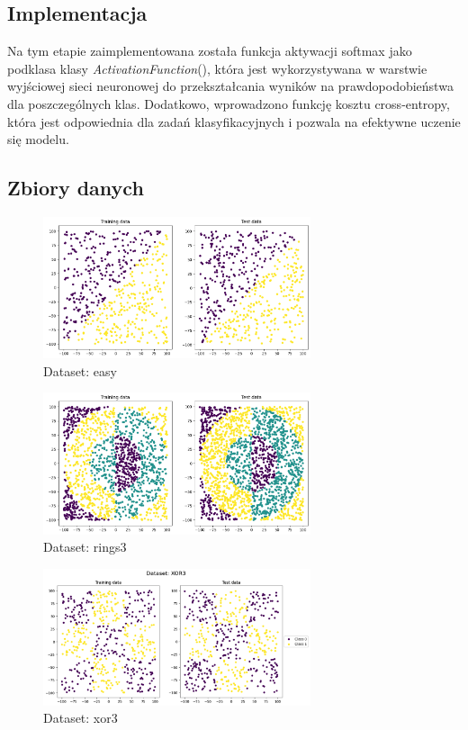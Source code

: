 \documentclass{article}
\begin{document}
\subsection*{Implementacja}
Na tym etapie zaimplementowana została funkcja aktywacji softmax jako podklasa klasy \textit{ActivationFunction}(), która jest wykorzystywana w warstwie wyjściowej sieci neuronowej do przekształcania wyników na prawdopodobieństwa dla poszczególnych klas. Dodatkowo, wprowadzono funkcję kosztu cross-entropy, która jest odpowiednia dla zadań klasyfikacyjnych i pozwala na efektywne uczenie się modelu.

\subsection*{Zbiory danych}
\begin{figure}[H]
    \centering
    \includegraphics[width=0.7\textwidth]{img/nn4/easy.png}
    \caption{Dataset: easy}
\end{figure}
\begin{figure}[H]
    \centering
    \includegraphics[width=0.7\textwidth]{img/nn4/rings3.png}
    \caption{Dataset: rings3}
\end{figure}
\begin{figure}[H]
    \centering
    \includegraphics[width=0.7\textwidth]{img/nn4/xor3.png}
    \caption{Dataset: xor3}
\end{figure}
\newpage
\end{document}
